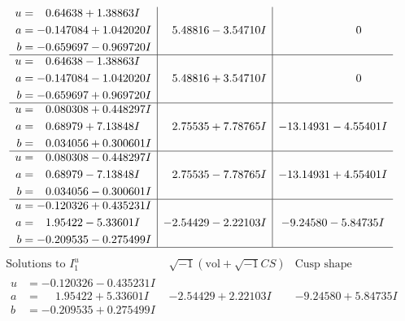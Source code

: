 \documentclass[1p]{elsarticle_modified}
\theoremstyle{definition}
\newcommand{\I}{\sqrt{-1}}
\begin{document}
$$\begin{array}{c|c|c}
\begin{aligned}
u &= \phantom{-}0.64638 + 1.38863 I \\
a &= -0.147084 + 1.042020 I \\
b &= -0.659697 - 0.969720 I\end{aligned}
 & \phantom{-}5.48816 - 3.54710 I & \phantom{-0.000000 } 0 \\ \hline\begin{aligned}
u &= \phantom{-}0.64638 - 1.38863 I \\
a &= -0.147084 - 1.042020 I \\
b &= -0.659697 + 0.969720 I\end{aligned}
 & \phantom{-}5.48816 + 3.54710 I & \phantom{-0.000000 } 0 \\ \hline\begin{aligned}
u &= \phantom{-}0.080308 + 0.448297 I \\
a &= \phantom{-}0.68979 + 7.13848 I \\
b &= \phantom{-}0.034056 + 0.300601 I\end{aligned}
 & \phantom{-}2.75535 + 7.78765 I & -13.14931 - 4.55401 I \\ \hline\begin{aligned}
u &= \phantom{-}0.080308 - 0.448297 I \\
a &= \phantom{-}0.68979 - 7.13848 I \\
b &= \phantom{-}0.034056 - 0.300601 I\end{aligned}
 & \phantom{-}2.75535 - 7.78765 I & -13.14931 + 4.55401 I \\ \hline\begin{aligned}
u &= -0.120326 + 0.435231 I \\
a &= \phantom{-}1.95422 - 5.33601 I \\
b &= -0.209535 - 0.275499 I\end{aligned}
 & -2.54429 - 2.22103 I & -9.24580 - 5.84735 I\\
 \hline 
 \end{array}$$\newpage$$\begin{array}{c|c|c}  
\text{Solutions to }I^u_{1}& \I (\text{vol} + \sqrt{-1}CS) & \text{Cusp shape}\\
 \hline 
\begin{aligned}
u &= -0.120326 - 0.435231 I \\
a &= \phantom{-}1.95422 + 5.33601 I \\
b &= -0.209535 + 0.275499 I\end{aligned}
 & -2.54429 + 2.22103 I & -9.24580 + 5.84735 I \\ \hline\begin{aligned}

\end{aligned}
\end{array}$$
\end{document}
